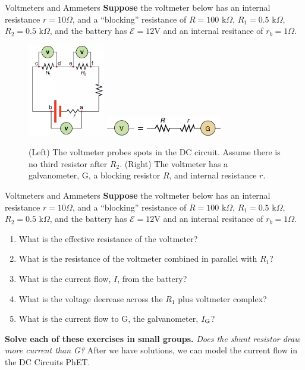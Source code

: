 \documentclass{beamer}
\begin{document}
\begin{frame}{Voltmeters and Ammeters}
\small
\textbf{\alert{Suppose}} the voltmeter below has an internal resistance $r = 10\Omega$, and a ``blocking'' resistance of $R = 100$ k$\Omega$, $R_1 = 0.5$ k$\Omega$, $R_2 = 0.5$ k$\Omega$, and the battery has $\mathcal{E} = 12$V and an internal resitance of $r_b = 1 \Omega$.
\footnotesize
\begin{figure}
\centering
\includegraphics[width=0.3\textwidth]{figures/voltmeter.png} \hspace{0.5cm}
\includegraphics[width=0.45\textwidth]{figures/galvo_1.png}
\caption{\label{fig:galvo3} (Left) The voltmeter probes spots in the DC circuit.  Assume there is no third resistor after $R_2$.  (Right) The voltmeter has a galvanometer, G, a blocking resistor $R$, and internal resistance $r$.}
\end{figure}
\end{frame}

\begin{frame}{Voltmeters and Ammeters}
\small
\textbf{\alert{Suppose}} the voltmeter below has an internal resistance $r = 10\Omega$, and a ``blocking'' resistance of $R = 100$ k$\Omega$, $R_1 = 0.5$ k$\Omega$, $R_2 = 0.5$ k$\Omega$, and the battery has $\mathcal{E} = 12$V and an internal resitance of $r_b = 1 \Omega$.
\begin{enumerate}
\item What is the effective resistance of the voltmeter?
\item What is the resistance of the voltmeter combined in parallel with $R_{1}$?
\item What is the current flow, $I$, from the battery?
\item What is the voltage decrease across the $R_1$ plus voltmeter complex?
\item What is the current flow to G, the galvanometer, $I_{\rm G}$?
\end{enumerate}
\textbf{Solve each of these exercises in small groups.}  \textit{Does the shunt resistor draw more current than G?}  After we have solutions, we can model the current flow in the DC Circuits PhET.
\end{frame}
\end{document}
